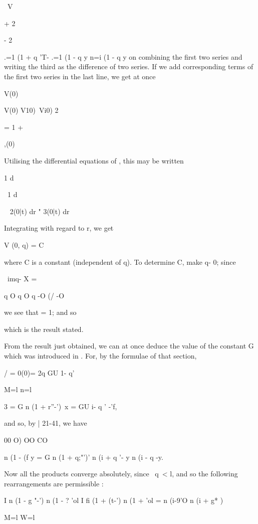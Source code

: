 \ V

+ 2

- 2

.=1 (1 + q 'T- .=1 (1 - q y n=i (1 - q y on combining the first two
series and writing the third as the difference of two series. If we
add corresponding terms of the first two series in the last line, we
get at once

V(0)

 V(0) V10)\ Vi0) 2

= 1 +

,(0) %

%
%

Utilising the differential equations of , this may be written

1 d%

\ 1 d%

~ 2(0|t) dr " 3(0|t) dr %

Integrating with regard to r, we get

V (0, q) = C%

where C is a constant (independent of q). To determine C, make q- 0;
since

\ imq- X = %

q O q O q -O (/ -O

we see that = 1; and so

which is the result stated.


From the result just obtained, we can at once deduce the value of the
constant G which was introduced in . For, by the formulae of
that section,

 / = 0(0)= 2q GU 1- q' %

M=l n=l

 3 = G n (1 + r''-')\ x = GU i- q ' -'f,

and so, by | 21-41, we have

00 O) OO CO

n (1 - (f y = G n (1 + q;"')' n (i + q '- y n (i - q -y.

Now all the products converge absolutely, since \ q\ < l, and so the
following rearrangements are permissible :

I n (1 - g "-') n (1 - ? 'ol  I fi (1 + (t-') n (1 + 'ol = n (i-9'O n
(i + g* )

M=l W=l

